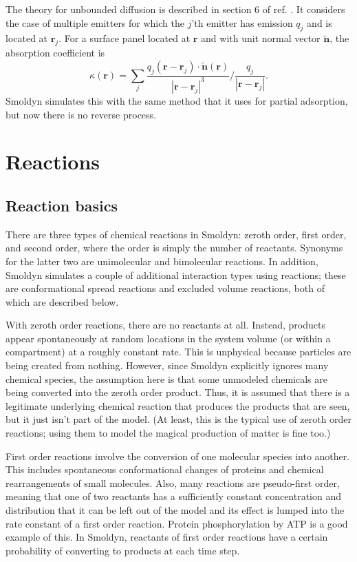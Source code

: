 \documentclass {scrbook}
\begin{document}
The theory for unbounded diffusion is described in section 6 of ref. \cite{Andrews_2009}. It considers the case of multiple emitters for which the $j$'th emitter has emission $q_j$ and is located at $\bm{r}_j$. For a surface panel located at $\bm{r}$ and with unit normal vector $\bm{\tilde{n}}$, the absorption coefficient is
$$\kappa(\bm{r}) = \sum_j \frac{q_j (\bm{r}-\bm{r}_j) \cdot \bm{\tilde{n}}(\bm{r})}{|\bm{r}-\bm{r}_j|^3} \bigg/ \frac{q_j}{|\bm{r}-\bm{r}_j|}.$$
Smoldyn simulates this with the same method that it uses for partial adsorption, but now there is no reverse process.


\chapter{Reactions}

\section{Reaction basics}

There are three types of chemical reactions in Smoldyn: zeroth order, first order, and second order, where the order is simply the number of reactants. Synonyms for the latter two are unimolecular and bimolecular reactions. In addition, Smoldyn simulates a couple of additional interaction types using reactions; these are conformational spread reactions and excluded volume reactions, both of which are described below.

With zeroth order reactions, there are no reactants at all. Instead, products appear spontaneously at random locations in the system volume (or within a compartment) at a roughly constant rate. This is unphysical because particles are being created from nothing. However, since Smoldyn explicitly ignores many chemical species, the assumption here is that some unmodeled chemicals are being converted into the zeroth order product. Thus, it is assumed that there is a legitimate underlying chemical reaction that produces the products that are seen, but it just isn't part of the model. (At least, this is the typical use of zeroth order reactions; using them to model the magical production of matter is fine too.)

First order reactions involve the conversion of one molecular species into another. This includes spontaneous conformational changes of proteins and chemical rearrangements of small molecules. Also, many reactions are pseudo-first order, meaning that one of two reactants has a sufficiently constant concentration and distribution that it can be left out of the model and its effect is lumped into the rate constant of a first order reaction. Protein phosphorylation by ATP is a good example of this. In Smoldyn, reactants of first order reactions have a certain probability of converting to products at each time step.
\end{document}
